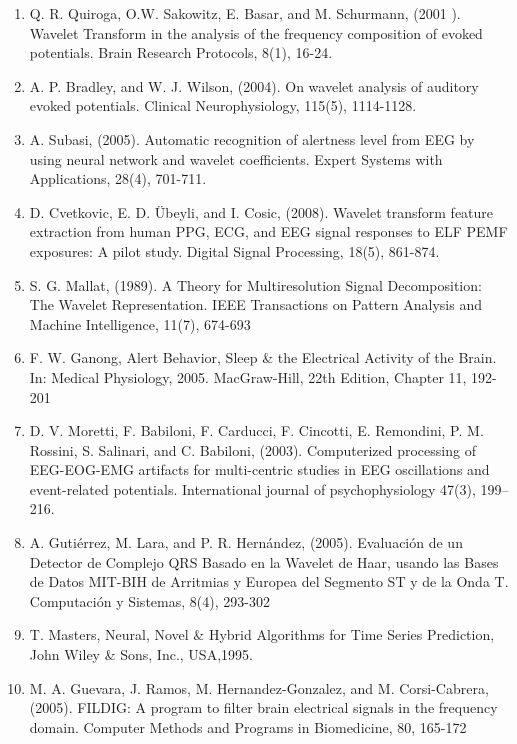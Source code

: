 \documentclass[12pt, a4paper]{article}
\begin{document}
\begin{enumerate}
\item  Q. R. Quiroga, O.W. Sakowitz, E. Basar, and M. Schurmann, (2001 ). Wavelet Transform in the analysis of the frequency composition of evoked potentials. Brain Research Protocols, 8(1), 16-24.

\item  A. P. Bradley, and W. J. Wilson, (2004). On wavelet analysis of auditory evoked potentials. Clinical Neurophysiology, 115(5), 1114-1128.


\item  A. Subasi, (2005). Automatic recognition of alertness level from EEG by using neural network and wavelet coefficients. Expert Systems with Applications, 28(4), 701-711.

\item  D. Cvetkovic, E. D. Übeyli, and I. Cosic, (2008). Wavelet transform feature extraction from human PPG, ECG, and EEG signal responses to ELF PEMF exposures: A pilot study. Digital Signal Processing, 18(5), 861-874.

\item  S. G. Mallat, (1989). A Theory for Multiresolution Signal Decomposition: The Wavelet Representation. IEEE Transactions on Pattern Analysis and Machine Intelligence, 11(7), 674-693 

\item  F. W. Ganong, Alert Behavior, Sleep \& the Electrical Activity of the Brain. In: Medical Physiology, 2005. MacGraw-Hill, 22th Edition, Chapter 11, 192-201

\item  D. V. Moretti, F. Babiloni, F. Carducci, F. Cincotti, E. Remondini, P. M. Rossini, S. Salinari, and C. Babiloni, (2003). Computerized processing of EEG-EOG-EMG artifacts for multi-centric studies in EEG oscillations and event-related potentials. International journal of psychophysiology 47(3), 199–216.

\item  A. Gutiérrez, M. Lara, and P. R. Hernández, (2005). Evaluación de un Detector de Complejo QRS Basado en la Wavelet de Haar, usando las Bases de Datos MIT-BIH de Arritmias y Europea del Segmento ST y de la Onda T. Computación y Sistemas, 8(4), 293-302

\item  T. Masters, Neural, Novel \& Hybrid Algorithms for Time Series Prediction, John 
Wiley \& Sons, Inc., USA,1995.

\item  M. A. Guevara, J. Ramos, M. Hernandez-Gonzalez, and M. Corsi-Cabrera, (2005). FILDIG: A program to filter brain electrical signals in the frequency domain. Computer Methods and Programs in Biomedicine, 80, 165-172


\end{enumerate}
\end{document}
